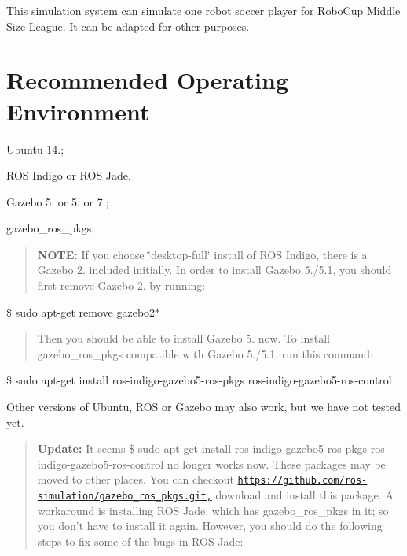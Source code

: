 This simulation system can simulate one robot soccer player for Robo\-Cup Middle Size League. It can be adapted for other purposes.

\section*{Recommended Operating Environment}


\begin{DoxyEnumerate}
\item Ubuntu 14.;
\item R\-O\-S Indigo or R\-O\-S Jade.
\item Gazebo 5. or 5. or 7.;
\item gazebo\-\_\-ros\-\_\-pkgs;
\end{DoxyEnumerate}

\begin{quotation}
{\bfseries N\-O\-T\-E\-:} If you choose \char`\"{}desktop-\/full\char`\"{} install of R\-O\-S Indigo, there is a Gazebo 2. included initially. In order to install Gazebo 5./5.1, you should first remove Gazebo 2. by running\-:

\end{quotation}
{\ttfamily \$ sudo apt-\/get remove gazebo2$\ast$} \begin{quotation}
Then you should be able to install Gazebo 5. now. To install gazebo\-\_\-ros\-\_\-pkgs compatible with Gazebo 5./5.1, run this command\-:

\end{quotation}
{\ttfamily \$ sudo apt-\/get install ros-\/indigo-\/gazebo5-\/ros-\/pkgs ros-\/indigo-\/gazebo5-\/ros-\/control}

Other versions of Ubuntu, R\-O\-S or Gazebo may also work, but we have not tested yet.

\begin{quotation}
{\bfseries Update\-:} It seems {\ttfamily \$ sudo apt-\/get install ros-\/indigo-\/gazebo5-\/ros-\/pkgs ros-\/indigo-\/gazebo5-\/ros-\/control} no longer works now. These packages may be moved to other places. You can checkout \href{https://github.com/ros-simulation/gazebo_ros_pkgs.git,}{\tt https\-://github.\-com/ros-\/simulation/gazebo\-\_\-ros\-\_\-pkgs.\-git,} download and install this package. A workaround is installing R\-O\-S Jade, which has gazebo\-\_\-ros\-\_\-pkgs in it; so you don't have to install it again. However, you should do the following steps to fix some of the bugs in R\-O\-S Jade\-:

\end{quotation}


